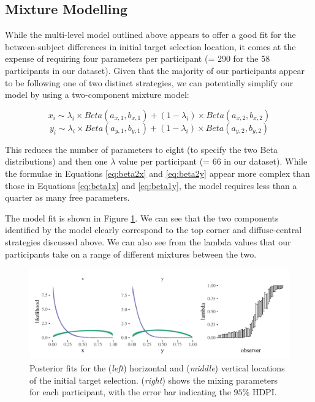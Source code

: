 \documentclass[preprints, article,submit,pdftex,moreauthors]{Definitions/mdpi}
\begin{document}
\subsection{Mixture Modelling}

While the multi-level model outlined above appears to offer a good fit for the between-subject differences in initial target selection location, it comes at the expense of requiring four parameters per participant (= 290 for the 58 participants in our dataset). Given that the majority of our participants appear to be following one of two distinct strategies, we can potentially simplify our model by using a two-component mixture model:

\begin{equation}
    x_i \sim \lambda_i \times Beta(a_{x,1}, b_{x,1}) + (1-\lambda_i) \times Beta(a_{x,2}, b_{x,2})
    \label{eq:beta2x}
\end{equation}
\begin{equation}
    y_i \sim \lambda_i \times Beta(a_{y,1}, b_{y,1}) + (1-\lambda_i) \times Beta(a_{y,2}, b_{y,2})
    \label{eq:beta2y}
\end{equation}

This reduces the number of parameters to eight (to specify the two Beta distributions) and then one $\lambda$ value per participant (= 66 in our dataset). While the formulae in Equations \ref{eq:beta2x} and \ref{eq:beta2y} appear more complex than those in Equations \ref{eq:beta1x} and \ref{eq:beta1y}, the model requires less than a quarter as many free parameters. 

The model fit is shown in Figure \ref{fig:qjep_init2_sel_mdl}. We can see that the two components identified by the model clearly correspond to the top corner and diffuse-central strategies discussed above. We can also see from the lambda values that our participants take on a range of different mixtures between the two. 

\begin{figure}[H]
\centering
\includegraphics[width=\textwidth]{Figures/init_sel2_mdl.pdf}
\caption{Posterior fits for the (\textit{left}) horizontal and (\textit{middle}) vertical locations of the initial target selection. (\textit{right}) shows the mixing parameters for each participant, with the error bar indicating the $95\%$ HDPI.}
\label{fig:qjep_init2_sel_mdl}
\end{figure} 
\end{document}
